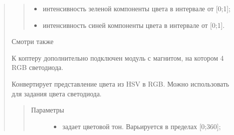 \documentclass[a4paper,10pt,russian]{sphinxmanual}
\begin{document}
\begin{quote}
\begin{fulllineitems}
\begin{fulllineitems}
\begin{quote}
\begin{description}
\begin{itemize}
\item {} 
 \textendash{} интенсивность зеленой компоненты цвета в интервале от {[}0;1{]};

\item {} 
 \textendash{} интенсивность синей компоненты цвета в интервале от {[}0;1{]}.

\end{itemize}

\end{description}\end{quote}

\end{fulllineitems}


\end{fulllineitems}


Смотри также {\hyperref[\detokenize{programming/lua/lua:fromHSV}]{}}


К коптеру дополнительно подключен модуль с магнитом, на котором 4 RGB светодиода.

%
\begin{sphinxVerbatim}[commandchars=\\\{\}]
   
      
       

      
       
\end{sphinxVerbatim}

\begin{fulllineitems}
\label{\detokenize{programming/lua/lua:fromHSV}}
Конвертирует представление цвета из HSV в RGB. Можно использовать для задания цвета светодиода.
\begin{quote}\begin{description}
\item[{Параметры}] \leavevmode\begin{itemize}
\item {} 
 \textendash{} задает цветовой тон. Варьируется в пределах {[}0;360{]};


\end{itemize}
\end{description}
\end{quote}
\end{fulllineitems}
\end{quote}
\end{document}
